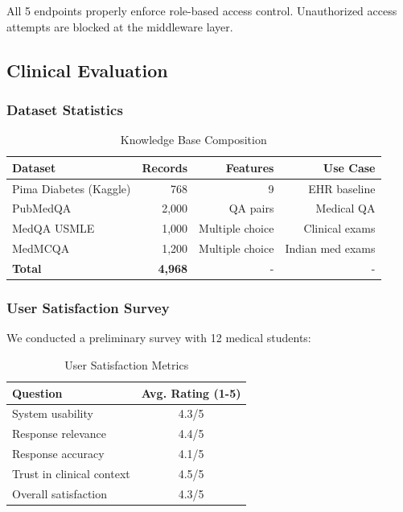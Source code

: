\documentclass[12pt,singleside,a4paper]{article}
\begin{document}
All 5 endpoints properly enforce role-based access control. Unauthorized access attempts are blocked at the middleware layer.

\subsection{Clinical Evaluation}

\subsubsection{Dataset Statistics}

\begin{table}[H]
\centering
\begin{tabular}{|l|r|r|r|}
\hline
\textbf{Dataset} & \textbf{Records} & \textbf{Features} & \textbf{Use Case} \\
\hline
Pima Diabetes (Kaggle) & 768 & 9 & EHR baseline \\
\hline
PubMedQA & 2,000 & QA pairs & Medical QA \\
\hline
MedQA USMLE & 1,000 & Multiple choice & Clinical exams \\
\hline
MedMCQA & 1,200 & Multiple choice & Indian med exams \\
\hline
\textbf{Total} & \textbf{4,968} & - & - \\
\hline
\end{tabular}
\caption{Knowledge Base Composition}
\end{table}

\subsubsection{User Satisfaction Survey}

We conducted a preliminary survey with 12 medical students:

\begin{table}[H]
\centering
\begin{tabular}{|l|c|}
\hline
\textbf{Question} & \textbf{Avg. Rating (1-5)} \\
\hline
System usability & 4.3/5 \\
\hline
Response relevance & 4.4/5 \\
\hline
Response accuracy & 4.1/5 \\
\hline
Trust in clinical context & 4.5/5 \\
\hline
Overall satisfaction & 4.3/5 \\
\hline
\end{tabular}
\caption{User Satisfaction Metrics}
\end{table}
\end{document}
